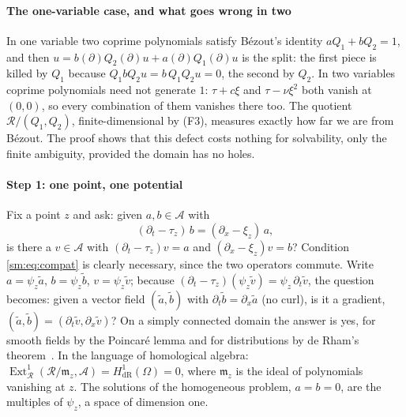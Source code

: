\documentclass[11pt]{article}
\theoremstyle{plain}
\theoremstyle{definition}
\theoremstyle{remark}
\newcommand{\ring}{\mathcal{R}}            %
\begin{document}
\paragraph{The one-variable case, and what goes wrong in two} In one variable two coprime polynomials satisfy B\'ezout's
identity $aQ_1+bQ_2=1$, and then $u=b(\partial)Q_2(\partial)u+a(\partial)Q_1(\partial)u$ is the split: the first piece is
killed by $Q_1$ because $Q_1bQ_2u=b\,Q_1Q_2u=0$, the second by $Q_2$. In two variables coprime polynomials need not
generate $1$: $\tau+c\xi$ and $\tau-\nu\xi^2$ both vanish at $(0,0)$, so every combination of them vanishes there too.
The quotient $\ring/(Q_1,Q_2)$, finite-dimensional by (F3), measures exactly how far we are from B\'ezout. The proof shows
that this defect costs nothing for solvability, only the finite ambiguity, provided the domain has no holes.

\paragraph{Step 1: one point, one potential} Fix a point $z$ and ask: given $a,b\in\mathcal A$ with
\begin{equation}\label{sm:eq:compat}
  (\partial_t-\tau_z)\,b=(\partial_x-\xi_z)\,a ,
\end{equation}
is there a $v\in\mathcal A$ with $(\partial_t-\tau_z)v=a$ and $(\partial_x-\xi_z)v=b$? Condition \eqref{sm:eq:compat} is
clearly necessary, since the two operators commute. Write $a=\psi_z\tilde a$, $b=\psi_z\tilde b$, $v=\psi_z\tilde v$; because
$(\partial_t-\tau_z)(\psi_z\tilde v)=\psi_z\,\partial_t\tilde v$, the question becomes: given a vector field
$(\tilde a,\tilde b)$ with $\partial_t\tilde b=\partial_x\tilde a$ (no curl), is it a gradient,
$(\tilde a,\tilde b)=(\partial_t\tilde v,\partial_x\tilde v)$? On a simply connected domain the answer is yes, for smooth
fields by the Poincar\'e lemma and for distributions by de Rham's theorem~\cite{Rha55}. In the language of homological
algebra: $\operatorname{Ext}^1_\ring(\ring/\mathfrak m_z,\mathcal A)=H^1_{\mathrm{dR}}(\Omega)=0$, where $\mathfrak m_z$ is
the ideal of polynomials vanishing at $z$. The solutions of the homogeneous problem, $a=b=0$, are the multiples of
$\psi_z$, a space of dimension one.
\end{document}
